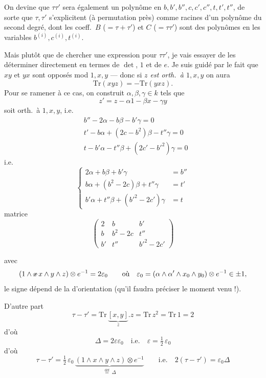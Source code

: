\documentclass[11pt,a4paper]{article}
\begin{document}
On devine que $\tau\tau'$ sera également un polynôme en
$b,b',b'',c,c',c'',t,t',t''$, de sorte que $\tau,\tau'$ s'explicitent (à
permutation près) comme racines d'un polynôme  du second degré,
dont les coeff.\ $B$ ($= \tau+\tau'$) et $C$ ($= \tau\tau'$) sont des polynômes en les
variables $b^{(i)}, c^{(i)}, t^{(i)}$.

Mais plutôt que de chercher une expression pour $\tau\tau'$, je vais essayer de les
 déterminer directement en termes de $\det$, $1$ et de $e$.
Je suis guidé par le fait que $xy$ et $yx$ sont opposés mod $1, x, y$
--- donc si \emph{$z$ est orth.\ à $1, x, y$}  \struck{$\det$} on aura
\[
  \mathrm{Tr}(xyz) = - \mathrm{Tr}(yxz) .
\]
Pour se ramener à ce cas, on construit $\alpha, \beta, \gamma \in k$ tels que
\[
  z' = z - \alpha 1 - \beta x - \gamma y
\]
soit orth.\ à $1, x, y$, i.e.\ 
\[
  \begin{aligned}
    &b'' - 2\alpha - b\beta - b'\gamma = 0 \\
    &t' - b\alpha + (2c - b^2)\beta - t''\gamma = 0 \\
    &t - b'\alpha - t''\beta + (2c' - b'^2)\gamma = 0
  \end{aligned}
\]
i.e.
\[
  \left\{
  \begin{aligned}
    2\alpha + b\beta + b'\gamma &= b'' \\
    b\alpha + (b^2 - 2c)\beta + t''\gamma &= t' \\
    b'\alpha + t''\beta + (b'^2 - 2c')\gamma &= t
  \end{aligned}
  \right.
\]
matrice
\[
  \begin{pmatrix}
    2 & b & b' \\
    b & b^2 - 2c & t'' \\
    b' & t'' & b'^2 - 2c'
  \end{pmatrix}
\]

avec \struck{\ill{}}
\[
  (1 \wedge \text{\struck{$x$}}\, x \wedge y \wedge z) \otimes e^{-1} = 2\varepsilon_0
  \qquad \text{où} \quad
  \varepsilon_0 = (\alpha \wedge \alpha' \wedge x_0 \wedge y_0) \otimes e^{-1} \in \pm 1 ,
\]
le signe dépend de la  d'orientation (qu'il faudra préciser le moment
venu !).

D'autre part
\[
  \tau - \tau' = \mathrm{Tr}\, \underbrace{[x,y]}_{z} . z = \mathrm{Tr}\, z^2 = \mathrm{Tr}\, 1 = 2
\]
d'où
\[
  \Delta = 2\varepsilon\varepsilon_0 \quad \text{i.e.} \quad \varepsilon = \tfrac12\, \varepsilon_0
\]
d'où
\[
  \boxed{\tau - \tau' = \tfrac12\, \varepsilon_0\, \underbrace{(1 \wedge x \wedge y \wedge z) \otimes e^{-1}}_{\overset{\text{déf}}{=}\ \Delta}}
  \qquad \text{i.e.} \quad 2(\tau - \tau') = \varepsilon_0 \Delta
\]
\end{document}
